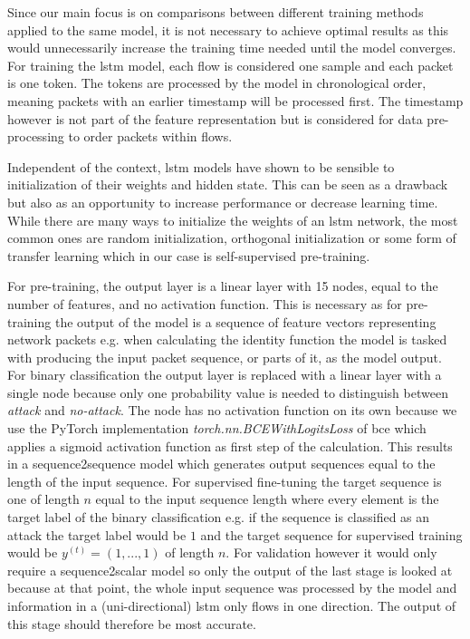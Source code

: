 Since our main focus is on comparisons between different training methods applied to the same model, it is not necessary to achieve optimal results as this would unnecessarily increase the training time needed until the model converges. For training the \gls{lstm} model, each flow is considered one sample and each packet is one token. The tokens are processed by the model in chronological order, meaning packets with an earlier timestamp will be processed first. The timestamp however is not part of the feature representation but is considered for data pre-processing to order packets within flows. \par
Independent of the context, \gls{lstm} models have shown to be sensible to initialization of their weights and hidden state. This can be seen as a drawback but also as an opportunity to increase performance or decrease learning time. While there are many ways to initialize the weights of an \gls{lstm} network, the most common ones are random initialization, orthogonal initialization or some form of transfer learning which in our case is self-supervised pre-training. \par
For pre-training, the output layer is a linear layer with 15 nodes, equal to the number of features, and no activation function. This is necessary as for pre-training the output of the model is a sequence of feature vectors representing network packets e.g. when calculating the identity function the model is tasked with producing the input packet sequence, or parts of it, as the model output. For binary classification the output layer is replaced with a linear layer with a single node because only one probability value is needed to distinguish between \textit{attack} and \textit{no-attack}. The node has no activation function on its own because we use the PyTorch implementation \textit{torch.nn.BCEWithLogitsLoss} of \gls{bce} which applies a sigmoid activation function as first step of the calculation. This results in a sequence2sequence model which generates output sequences equal to the length of the input sequence. For supervised fine-tuning the target sequence is one of length $n$ equal to the input sequence length where every element is the target label of the binary classification e.g. if the sequence is classified as an attack the target label would be $1$ and the target sequence for supervised training would be $y^{(t)} = (1,...,1)$ of length $n$. For validation however it would only require a sequence2scalar model so only the output of the last stage is looked at because at that point, the whole input sequence was processed by the model and information in a (uni-directional) \gls{lstm} only flows in one direction. The output of this stage should therefore be most accurate.

